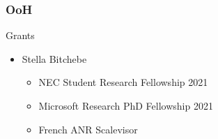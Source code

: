 \documentclass[xcolor=table,bigger,unknownkeysallowed]{beamer}
\begin{document}
        \begin{frame}
        \frametitle{OoH} 
			\begin{block}{Grants}
				\begin{itemize}
					\item Stella Bitchebe
					\begin{itemize}
						\item NEC Student Research Fellowship 2021
						\item Microsoft Research PhD Fellowship 2021
						\item French ANR Scalevisor
					\end{itemize}
				\end{itemize}
			\end{block}			
        \end{frame}                                                    
\end{document}
